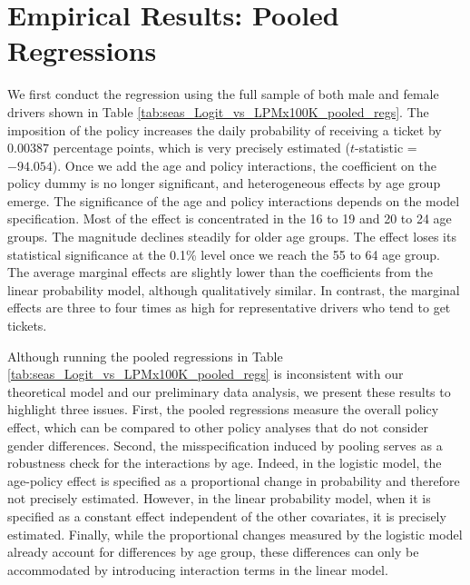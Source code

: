 \section{Empirical Results: Pooled Regressions}
\label{app:Pooled}


We first conduct the regression using the full sample
of both male and female drivers
shown in 
% 
Table \ref{tab:seas_Logit_vs_LPMx100K_pooled_regs}.
% 
The imposition of the policy increases the daily probability 
of receiving a ticket by $0.00387$ percentage points, 
which is very precisely estimated ($t$-statistic = $-94.054$). 
Once we add the age and policy interactions, 
the coefficient on the policy dummy is no longer significant, 
and heterogeneous effects by age group emerge. 
% 
The significance of the age and policy interactions
depends on the model specification. 
% 
Most of the effect is concentrated in the 16 to 19 and 20 to 24 age groups. The magnitude declines steadily for older age groups. 
The effect loses its statistical significance at the 0.1\% level once we reach the 55 to 64 age group.
% 
The average marginal effects are slightly lower than the coefficients 
from the linear probability model, although qualitatively similar. 
In contrast, the marginal effects are three to four times as high
for representative drivers who tend to get tickets. 




Although running the pooled regressions in 
Table \ref{tab:seas_Logit_vs_LPMx100K_pooled_regs}
is inconsistent with our theoretical model and our preliminary data analysis, 
we present these results to highlight three issues. 
% 
First, the pooled regressions measure the overall policy effect, 
which can be compared to other policy analyses that do not
consider gender differences. 
% 
Second, the misspecification induced by pooling serves as a robustness check for the interactions by age. Indeed, in the logistic model, the age-policy effect is specified as a proportional change in probability and therefore not precisely estimated. However, in the linear probability model, when it is specified as a constant effect independent of the other covariates, it is precisely estimated.
%
Finally, while the proportional changes measured by the logistic model already account for differences by age group, these differences can only be accommodated by introducing interaction terms in the linear model.


